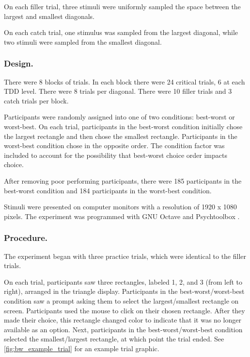 {{{{On each filler trial, three stimuli were uniformly sampled the space between the largest and smallest diagonals.

On each catch trial, one stimulus was sampled from the largest diagonal, while two stimuli were sampled from the smallest diagonal.

\subsubsection{Design.}
There were 8 blocks of trials. In each block there were 24 critical trials, 6 at each TDD level. There were 8 trials per diagonal. There were 10 filler trials and 3 catch trials per block.

Participants were randomly assigned into one of two conditions: best-worst or worst-best. On each trial, participants in the best-worst condition initially chose the largest rectangle and then chose the smallest rectangle. Participants in the worst-best condition chose in the opposite order. The condition factor was included to account for the possibility that best-worst choice order impacts choice.

After removing poor performing participants, there were 185 participants in the best-worst condition and 184 participants in the worst-best condition.

Stimuli were presented on computer monitors with a resolution of 1920 x 1080 pixels. The experiment was programmed with GNU Octave and Psychtoolbox \parencite{octave,brainardPsychophysicsToolbox1997}. 

\subsubsection{Procedure.}

The experiment began with three practice trials, which were identical to the filler trials. 

On each trial, participants saw three rectangles, labeled 1, 2, and 3 (from left to right), arranged in the triangle display. Participants in the best-worst/worst-best condition saw a prompt asking them to select the largest/smallest rectangle on screen. Participants used the mouse to click on their chosen rectangle. After they made their choice, this rectangle changed color to indicate that it was no longer available as an option. Next, participants in the best-worst/worst-best condition selected the smallest/largest rectangle, at which point the trial ended. See \ref{fig:bw_example_trial} for an example trial graphic.

}}}}

